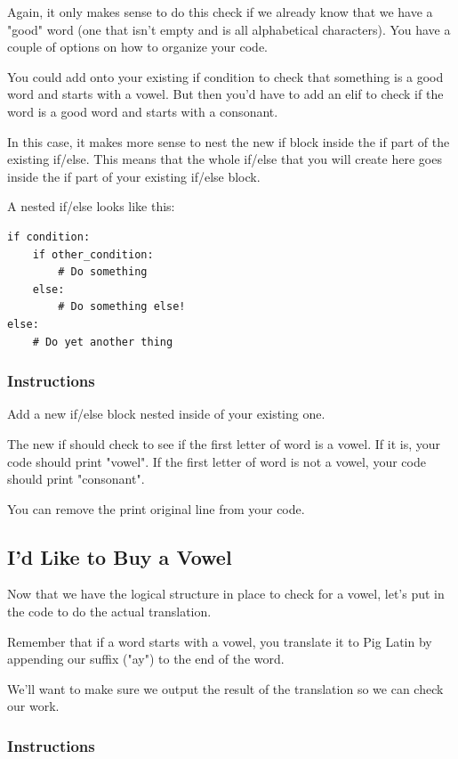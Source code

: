\documentclass[12pt,a4paper,final,twoside,onecolumn,titlepage]{book}
\begin{document}
Again, it only makes sense to do this check if we already know that we have a "good" word (one that isn't empty and is all alphabetical characters). You have a couple of options on how to organize your code.

You could add onto your existing if condition to check that something is a good word and starts with a vowel. But then you'd have to add an elif to check if the word is a good word and starts with a consonant.

In this case, it makes more sense to nest the new if block inside the if part of the existing if/else. This means that the whole if/else that you will create here goes inside the if part of your existing if/else block.

A nested if/else looks like this:

\begin{lstlisting}
if condition:
    if other_condition:
        # Do something
    else:
        # Do something else!
else:
    # Do yet another thing

\end{lstlisting}

\subsubsection{Instructions}

Add a new if/else block nested inside of your existing one.

The new if should check to see if the first letter of word is a vowel. If it is, your code should print "vowel". If the first letter of word is not a vowel, your code should print "consonant".

You can remove the print original line from your code.

\subsection{I'd Like to Buy a Vowel}

Now that we have the logical structure in place to check for a vowel, let's put in the code to do the actual translation.

Remember that if a word starts with a vowel, you translate it to Pig Latin by appending our suffix ("ay") to the end of the word.

We'll want to make sure we output the result of the translation so we can check our work.
\subsubsection{Instructions}
\end{document}

